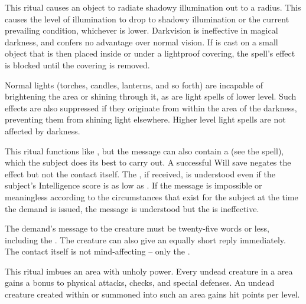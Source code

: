 \spelldur{\durlong \dismissable}
\spelleffect This ritual causes an object to radiate shadowy illumination out to a \areamed radius. This causes the level of illumination to drop to shadowy illumination or the current prevailing condition, whichever is lower. Darkvision is ineffective in magical darkness, and confers no advantage over normal vision.
\spellnotes If  is cast on a small object that is then placed inside or under a lightproof covering, the spell's effect is blocked until the covering is removed.

Normal lights (torches, candles, lanterns, and so forth) are incapable of brightening the area or shining through it, as are light spells of lower level. Such effects are also suppressed if they originate from within the area of the darkness, preventing them from shining light elsewhere. Higher level light spells are not affected by darkness.

\spelleffect This ritual functions like , but the message can also contain a  (see the  spell), which the subject does its best to carry out. A successful Will save negates the  effect but not the contact itself. The , if received, is understood even if the subject's Intelligence score is as low as . If the message is impossible or meaningless according to the circumstances that exist for the subject at the time the demand is issued, the message is understood but the  is ineffective.
\par The demand's message to the creature must be twenty-five words or less, including the . The creature can also give an equally short reply immediately.
\spellnotes The contact itself is not mind-affecting -- only the .

\spelleffect This ritual imbues an area with unholy power. Every undead creature in a  area gains a  bonus to physical attacks, checks, and special defenses. An undead creature created within or summoned into such an area gains  hit points per level.

